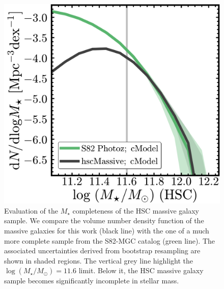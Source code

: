 \documentclass[a4paper,fleqn,usenatbib]{mnras}
\def\mstar{{$M_{\star}$}}
\def\logms{{$\log (M_{\star}/M_{\odot})$}}
\begin{document}
  \begin{figure}
      \centering 
      \includegraphics[width=\columnwidth]{fig/redbcg_completeness}
      \caption{
          Evaluation of the \mstar{} completeness of the HSC massive galaxy sample.
          We compare the volume number density function of the massive galaxies 
          for this work (black line) with the one of a much more complete sample
          from the S82-MGC catalog (green line).  
          The associated uncertainties derived from bootstrap resampling are shown in 
          shaded regions. 
          The vertical grey line highlight the \logms{}$=11.6$ limit.  
          Below it, the HSC massive galaxy sample becomes significantly incomplete in 
          stellar mass. 
          }
      \label{fig:mass_complete}
  \end{figure}     
 
\end{document}
